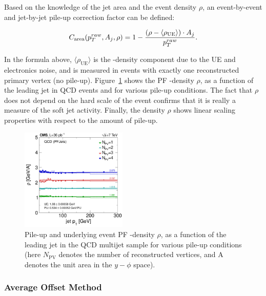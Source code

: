 Based on the knowledge of the jet area and the event density $\rho$, an event-by-event and jet-by-jet pile-up correction factor can be defined:

\begin{equation}
\label{eq:fastjet}
  C_\text{area}(p_{{T}}^{raw},A_j,\rho) = 1-\frac{\left(\rho-\langle\rho_\text{UE}\rangle\right)\cdot A_j}{p_{{T}}^{raw}}.
\end{equation}

In the formula above, $\langle\rho_\text{UE}\rangle$ is the \pt-density component due to the UE and electronics noise, and is measured in events with exactly one reconstructed primary vertex (no pile-up). Figure~\ref{fig:fastjet} shows the PF \pt-density $\rho$, as a function of the leading jet \pt in QCD events and for various pile-up conditions. The fact that $\rho$ does not depend on the hard scale of the event confirms that it is really a measure of the soft jet activity. Finally, the density $\rho$ shows linear scaling properties with respect to the amount of pile-up.

\begin{figure}[ht!]
  \begin{center}
    \includegraphics[width=0.45\textwidth]{Figures/JEC/QCD_RhoVsJet1Pt}
    \caption{Pile-up and underlying event PF \pt-density $\rho$, as a function of the leading jet \pt in the QCD multijet sample for various pile-up conditions (here $N_\text{PV}$ denotes the number of reconstructed vertices, and A denotes the unit area in the $y-\phi$ space).}
    \label{fig:fastjet}
  \end{center}
\end{figure}

\subsubsection{Average Offset Method}

